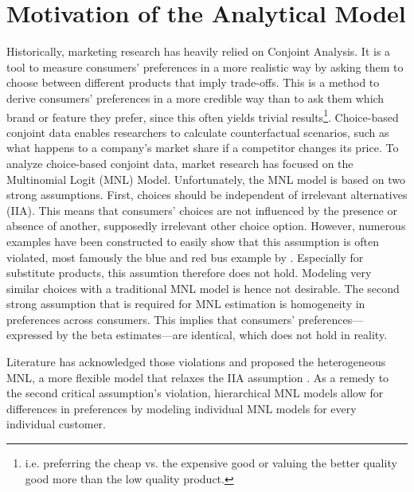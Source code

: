 \documentclass[12pt,a4paper]{article}
\begin{document}
\section{Motivation of the Analytical Model} \label{sec_motivation}
Historically, marketing research has heavily relied on Conjoint Analysis.
It is a tool to measure consumers' preferences in a more realistic way by asking them to choose between different products that imply trade-offs.
This is a method to derive consumers' preferences in a more credible way than to ask them which brand or feature they prefer,
since this often yields trivial results\footnote{i.e. preferring the cheap vs. the expensive good or valuing the better quality good more than the low quality product.}.
Choice-based conjoint data enables researchers to calculate counterfactual scenarios, such as what happens to a company's market share if a competitor changes its price.
To analyze choice-based conjoint data, market research has focused on the Multinomial Logit (MNL) Model.
Unfortunately, the MNL model is based on two strong assumptions.
First, choices should be independent of irrelevant alternatives (IIA).
This means that consumers' choices are not influenced by the presence or absence of another, supposedly irrelevant other choice option.
However, numerous examples have been constructed to easily show that this assumption is often violated, most famously the blue and red bus example by \cite{mcfaddenConditionalLogitAnalysis1973}.
Especially for substitute products, this assumtion therefore does not hold. 
Modeling very similar choices with a traditional MNL model is hence not desirable.
The second strong assumption that is required for MNL estimation is homogeneity in preferences across consumers.
This implies that consumers' preferences---expressed by the beta estimates---are identical, which does not hold in reality. 

Literature has acknowledged those violations and proposed the heterogeneous MNL, a more flexible model that relaxes the IIA assumption \citep{steckelHeterogeneousConditionalLogit1988}.
As a remedy to the second critical assumption's violation, hierarchical MNL models allow for differences in preferences by modeling individual MNL models for every individual customer.
\end{document}
